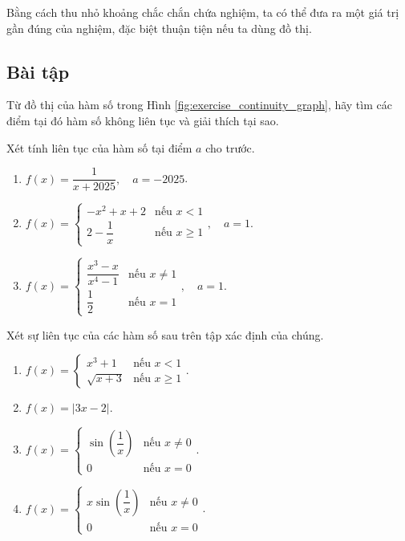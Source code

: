 Bằng cách thu nhỏ khoảng chắc chắn chứa nghiệm, ta có thể đưa ra một giá trị gần đúng của nghiệm, đặc biệt thuận tiện nếu ta dùng đồ thị.

\subsection{Bài tập}

\begin{exercise}
    Từ đồ thị của hàm số trong Hình \ref{fig:exercise_continuity_graph}, hãy tìm các điểm tại đó hàm số không liên tục và giải thích tại sao.
    
\end{exercise}

\begin{exercise}
	Xét tính liên tục của hàm số tại điểm \( a \) cho trước.
	\begin{enumerate}[label=(\alph*)]
		\item \( f(x) = \dfrac{1}{x+2025}, \quad a = -2025 \).
		\item \( f(x) = \begin{cases} -x^2 + x + 2 & \text{nếu } x < 1 \\ 2 - \dfrac{1}{x} & \text{nếu } x \ge 1 \end{cases}, \quad a=1 \).
		\item \( f(x) = \begin{cases} \dfrac{x^3-x}{x^4-1} & \text{nếu } x \ne 1 \\ \dfrac{1}{2} & \text{nếu } x=1 \end{cases}, \quad a=1 \).
	\end{enumerate}
\end{exercise}

\begin{exercise}
	Xét sự liên tục của các hàm số sau trên tập xác định của chúng.
	\begin{enumerate}[label=(\alph*)]
		\item \( f(x) = \begin{cases} x^3 + 1 & \text{nếu } x < 1 \\ \sqrt{x+3} & \text{nếu } x \ge 1 \end{cases} \).
		\item \( f(x) = |3x - 2| \).
		\item \( f(x) = \begin{cases} \sin\left(\dfrac{1}{x}\right) & \text{nếu } x \ne 0 \\ 0 & \text{nếu } x=0 \end{cases} \).
		\item \( f(x) = \begin{cases} x \sin\left(\dfrac{1}{x}\right) & \text{nếu } x \ne 0 \\ 0 & \text{nếu } x=0 \end{cases} \).
	\end{enumerate}
\end{exercise}

